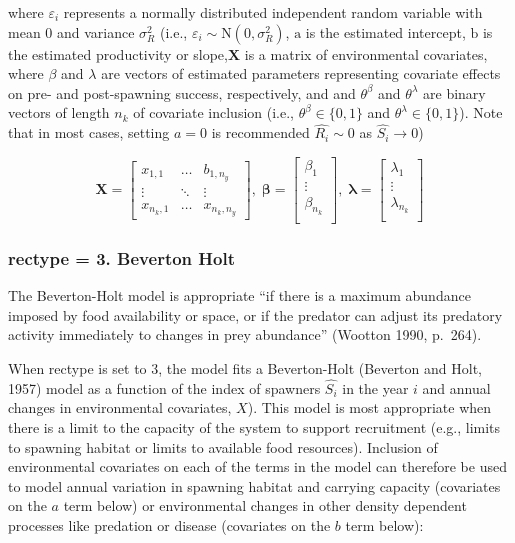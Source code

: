 \documentclass[
]{article}
\begin{document}
where \(\varepsilon_i\) represents a normally distributed independent
random variable with mean 0 and variance \(\sigma^2_R\) (i.e.,
\(\varepsilon_i\sim \mathrm N(0,\sigma^2_R)\), \(\mathrm{a}\) is the
estimated intercept, \(\mathrm{b}\) is the estimated productivity or
slope,\(\mathbf{X}\) is a matrix of environmental covariates, where
\(\beta\) and \(\lambda\) are vectors of estimated parameters
representing covariate effects on pre- and post-spawning success,
respectively, and and \(\theta^{\beta}\) and \(\theta^{\lambda}\) are
binary vectors of length \(n_k\) of covariate inclusion (i.e.,
\({\theta^{\beta}} \in \{0,1 \}\) and
\({\theta^{\lambda}} \in \{0,1 \}\)). Note that in most cases, setting
\(a =0\) is recommended \(\hat{R_i}\sim0\) as \(\hat{S_i}\to0\))

\[\mathbf{X} = \left[\begin{array}
{rrr}
x_{1,1} & \dots  & b_{1,n_y} \\
\vdots & \ddots & \vdots \\
x_{n_k,1} & \dots  & x_{n_k,n_y} 
\end{array}\right],\; 
\mathbf{\beta} = \left[\begin{array}
{rrr}
\beta_1 \\
\vdots  \\
\beta_{n_k} \\
\end{array}\right],\; 
\mathbf{\lambda} = \left[\begin{array}
{rrr}
\lambda_1 \\
\vdots  \\
\lambda_{n_k}\\
\end{array}\right]
\]

\hypertarget{rectype-3.-beverton-holt}{%
\subsubsection{rectype = 3. Beverton
Holt}\label{rectype-3.-beverton-holt}}

The Beverton-Holt model is appropriate ``if there is a maximum abundance
imposed by food availability or space, or if the predator can adjust its
predatory activity immediately to changes in prey abundance'' (Wootton
1990, p.~264).

When rectype is set to 3, the model fits a Beverton-Holt (Beverton and
Holt, 1957) model as a function of the index of spawners \(\hat{S_i}\)
in the year \(i\) and annual changes in environmental covariates,
\({X}\)). This model is most appropriate when there is a limit to the
capacity of the system to support recruitment (e.g., limits to spawning
habitat or limits to available food resources). Inclusion of
environmental covariates on each of the terms in the model can therefore
be used to model annual variation in spawning habitat and carrying
capacity (covariates on the \(a\) term below) or environmental changes
in other density dependent processes like predation or disease
(covariates on the \(b\) term below):
\end{document}
